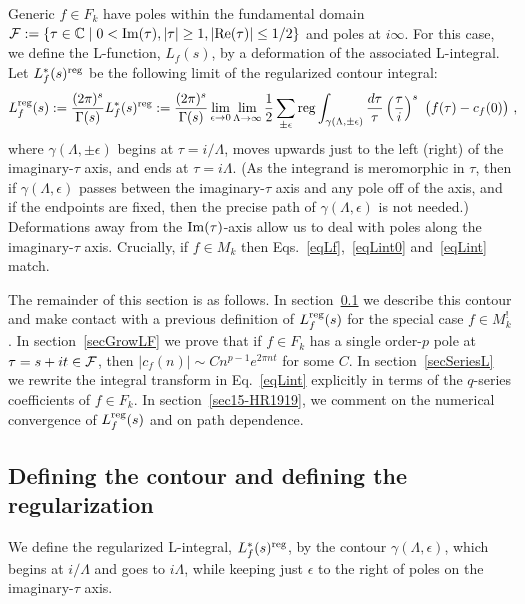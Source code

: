 \documentclass[11pt,a4paper]{article}
\newcommand{\g}{\gamma}
\newcommand{\e}{\epsilon}
\newcommand{\G}{\Gamma}
\newcommand{\La}{\Lambda}
\def\C{\mathbb{C}}
\newcommand{\reg}{{\rm reg}}
\begin{document}
Generic $f \in F_k$ have poles within the fundamental domain ${\cal F}:=\{ \tau \in \C \mid 0 < {\rm Im}(\tau), |\tau| \geq 1, |{\rm Re}(\tau)| \leq 1/2 \}$ and poles at $i \infty$. For this case, we define the L-function, $L_f(s)$, by a deformation of the associated L-integral. Let $L_f^*(s)^{\reg}$ be the following limit of the regularized contour integral:
\begin{align}
L_f^\reg(s) := \frac{(2\pi)^s}{\G(s)} L_f^*(s)^{\reg} 
:= \frac{(2\pi)^s}{\G(s)}  
\lim_{\e \to 0} 
\lim_{\La \to \infty} 
\frac{1}{2}\sum_{\pm \e} 
\reg \int_{\g(\La,\pm\e)}
\frac{d\tau}{\tau} 
\left( \frac{\tau}{i}\right)^s 
~\big(f(\tau)-c_f(0)\big)~,
\label{eqLint}
\!\!\!
\end{align}
where $\g(\La,\pm\e)$ begins at $\tau = i/\Lambda$, moves upwards just to the left (right) of the imaginary-$\tau$ axis, and ends at $\tau = i\Lambda$. (As the integrand is meromorphic in $\tau$, then if $\g(\La,\e)$ passes between the imaginary-$\tau$ axis and any pole off of the axis, and if the endpoints are fixed, then the precise path of $\g(\La,\e)$ is not needed.) Deformations away from the ${\rm Im}(\tau)$-axis allow us to deal with poles along the imaginary-$\tau$ axis. Crucially, if $f \in M_k$ then Eqs.~\eqref{eqLf},~\eqref{eqLint0} and~\eqref{eqLint} match.

The remainder of this section is as follows. In section~\ref{secContourL} we describe this contour and make contact with a previous definition of $L^{\rm reg}_f(s)$ for the special case $f \in M_k^!$. In section~\ref{secGrowLF} we prove that if $f \in F_k$ has a single order-$p$ pole at $\tau = s + i t \in {\cal F}$, then $|c_f(n)| \sim C n^{p-1} e^{2 \pi n t}$ for some $C$. In section~\ref{secSeriesL} we rewrite the integral transform in Eq.~\eqref{eqLint} explicitly in terms of the $q$-series coefficients of $f \in F_k$. In section~\ref{sec15-HR1919}, we comment on the numerical convergence of $L_f^\reg(s)$ and on path dependence.

\subsection{Defining the contour and defining the regularization}\label{secContourL}

We define the regularized L-integral, $L_f^*(s)^{\reg}$, by the contour $\g(\La,\e)$, which begins at $i/\La$ and goes to $i \La$, while keeping just $\e$ to the right of poles on the imaginary-$\tau$ axis. 
\end{document}
